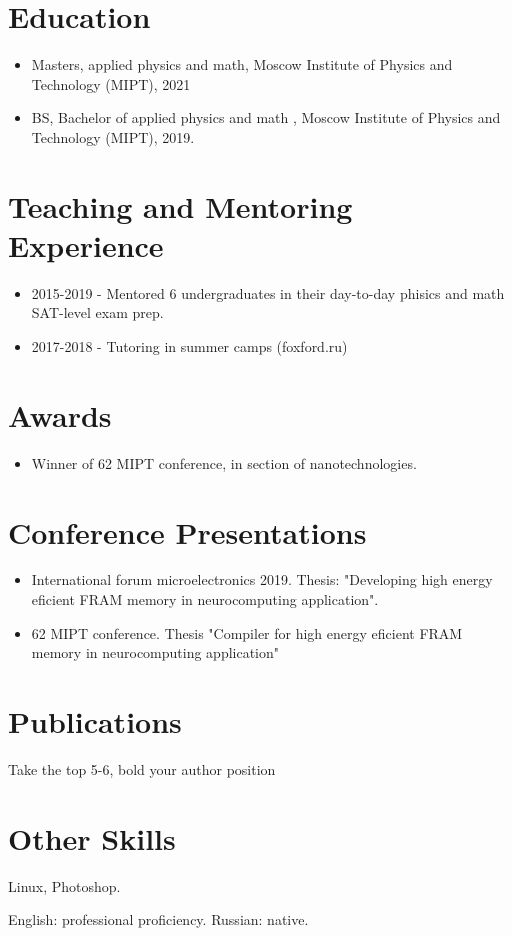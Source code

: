 \documentclass{article}
\begin{document}
 
\section{Education}

\begin{itemize}
\item Masters, applied physics and math, Moscow Institute of Physics and Technology (MIPT), 2021  
\item BS, Bachelor of applied physics and math , Moscow Institute of Physics and Technology (MIPT), 2019.
\end{itemize}
 
\section{Teaching and Mentoring Experience }
\begin{itemize}
\item 2015-2019 - Mentored 6 undergraduates in their day-to-day phisics and math SAT-level exam prep.
\item 2017-2018 - Tutoring in summer camps (foxford.ru)
\end{itemize}

\section{Awards}
\begin{itemize}
\item Winner of 62 MIPT conference, in section of nanotechnologies.
\end{itemize}

\section{Conference Presentations }

\begin{itemize}
\item International forum microelectronics 2019. Thesis: "Developing high energy eficient FRAM memory in neurocomputing application".
\item 62 MIPT conference. Thesis "Compiler for high energy eficient FRAM memory in neurocomputing application"
\end{itemize}

 
\section{Publications}
Take the top 5-6, bold your author position 


\section{Other Skills}
\begin{description}[widest=Langauges]
\item[Software]	Linux, Photoshop.
\item[Languages]	English: professional proficiency.  Russian: native.
\end{description}
\end{document}
